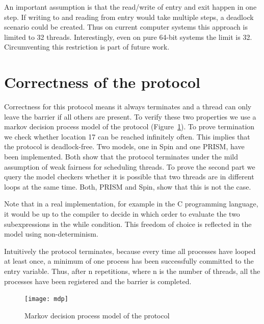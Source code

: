\documentclass[a4paper, 10pt]{article}
\begin{document}
An important assumption is that the read/write of entry and exit happen in one step. If writing to and reading from entry would take multiple steps, a deadlock scenario could be created. Thus on current computer systems this approach is limited to 32 threads. Interestingly, even on pure 64-bit systems the limit is 32. Circumventing this restriction is part of future work.

\section{Correctness of the protocol}
\label{sec:correctness}
Correctness for this protocol means it always terminates and a thread can only leave the barrier if all others are present. To verify these two properties we use a markov decision process model of the protocol (Figure~\ref{fig:mdp}). To prove termination we check whether location 17 can be reached infinitely often. This implies that the protocol is deadlock-free. Two models, one in Spin\cite{spin} and one PRISM\cite{prism}, have been implemented. Both show that the protocol terminates under the mild assumption of weak fairness for scheduling threads. To prove the second part we query the model checkers whether it is possible that two threads are in different loops at the same time. Both, PRISM and Spin, show that this is not the case.

Note that in a real implementation, for example in the C programming language, it would be up to the compiler to decide in which order to evaluate the two subexpressions in the while condition. This freedom of choice is reflected in the model using non-determinism.

Intuitively the protocol terminates, because every time all processes have looped at least once, a minimum of one process has been successfully committed to the entry variable. Thus, after n repetitions, where n is the number of threads, all the processes have been registered and the barrier is completed.

\begin{figure}[htbp]
	\centering
	\texttt{[image: mdp]}
	\caption{Markov decision process model of the protocol}
	\label{fig:mdp}
\end{figure}

\clearpage

\end{document}

